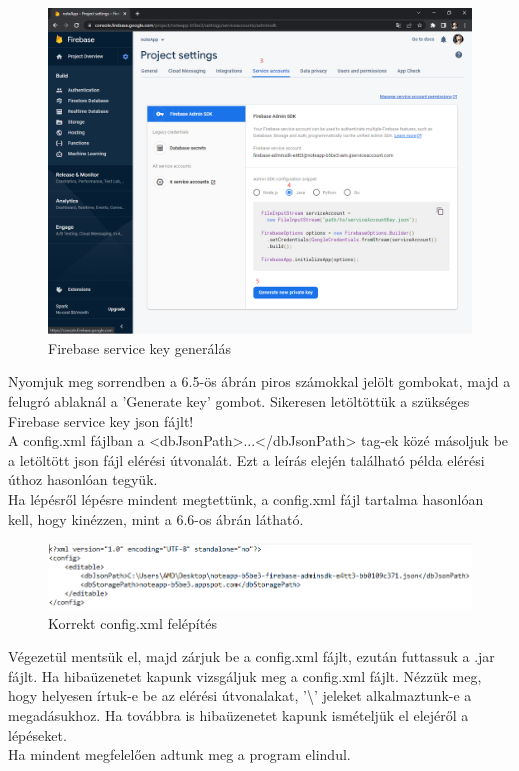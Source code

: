 \begin{figure}[h]
	\centering
	\includegraphics[scale=0.2]{images/config_5.png}
	\caption{Firebase service key generálás}
	\label{fig:firebase_service_key}
\end{figure}
\noindent Nyomjuk meg sorrendben a 6.5-ös ábrán piros számokkal jelölt gombokat, majd a felugró ablaknál a 'Generate key' gombot. Sikeresen letöltöttük a szükséges Firebase service key json fájlt!
\vspace{5pt}\\A config.xml fájlban a <dbJsonPath>...</dbJsonPath> tag-ek közé másoljuk be a letöltött json fájl elérési útvonalát. Ezt a leírás elején található példa elérési úthoz hasonlóan tegyük.
\vspace{5pt}\\ Ha lépésről lépésre mindent megtettünk, a config.xml fájl tartalma hasonlóan kell, hogy kinézzen, mint a 6.6-os ábrán látható.
\begin{figure}[h]
	\centering
	\includegraphics[scale=0.5]{images/config_6.png}
	\caption{Korrekt config.xml felépítés}
	\label{fig:config_file_final}
\end{figure}
\newline
\noindent Végezetül mentsük el, majd zárjuk be a config.xml fájlt, ezután futtassuk a .jar fájlt. Ha hibaüzenetet kapunk vizsgáljuk meg a config.xml fájlt. Nézzük meg, hogy helyesen írtuk-e be az elérési útvonalakat, '\textbackslash' jeleket alkalmaztunk-e a megadásukhoz. Ha továbbra is hibaüzenetet kapunk ismételjük el elejéről a lépéseket.
\vspace{5pt}\\ Ha mindent megfelelően adtunk meg a program elindul.


